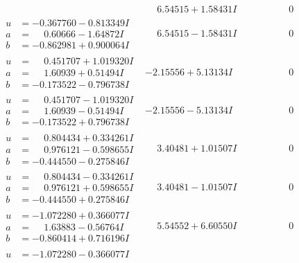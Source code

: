 \documentclass[1p]{elsarticle_modified}
\theoremstyle{definition}
\begin{document}
$$\begin{array}{c|c|c}
 & \phantom{-}6.54515 + 1.58431 I & \phantom{-0.000000 } 0 \\ \hline\begin{aligned}
u &= -0.367760 - 0.813349 I \\
a &= \phantom{-}0.60666 - 1.64872 I \\
b &= -0.862981 + 0.900064 I\end{aligned}
 & \phantom{-}6.54515 - 1.58431 I & \phantom{-0.000000 } 0 \\ \hline\begin{aligned}
u &= \phantom{-}0.451707 + 1.019320 I \\
a &= \phantom{-}1.60939 + 0.51494 I \\
b &= -0.173522 - 0.796738 I\end{aligned}
 & -2.15556 + 5.13134 I & \phantom{-0.000000 } 0 \\ \hline\begin{aligned}
u &= \phantom{-}0.451707 - 1.019320 I \\
a &= \phantom{-}1.60939 - 0.51494 I \\
b &= -0.173522 + 0.796738 I\end{aligned}
 & -2.15556 - 5.13134 I & \phantom{-0.000000 } 0 \\ \hline\begin{aligned}
u &= \phantom{-}0.804434 + 0.334261 I \\
a &= \phantom{-}0.976121 - 0.598655 I \\
b &= -0.444550 - 0.275846 I\end{aligned}
 & \phantom{-}3.40481 + 1.01507 I & \phantom{-0.000000 } 0 \\ \hline\begin{aligned}
u &= \phantom{-}0.804434 - 0.334261 I \\
a &= \phantom{-}0.976121 + 0.598655 I \\
b &= -0.444550 + 0.275846 I\end{aligned}
 & \phantom{-}3.40481 - 1.01507 I & \phantom{-0.000000 } 0 \\ \hline\begin{aligned}
u &= -1.072280 + 0.366077 I \\
a &= \phantom{-}1.63883 - 0.56764 I \\
b &= -0.860414 + 0.716196 I\end{aligned}
 & \phantom{-}5.54552 + 6.60550 I & \phantom{-0.000000 } 0 \\ \hline\begin{aligned}
u &= -1.072280 - 0.366077 I \\

\end{aligned}
\end{array}$$
\end{document}
